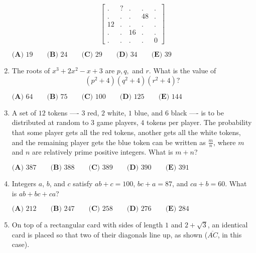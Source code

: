 \documentclass{article}
\begin{document}
\begin{enumerate}[label=\arabic*., itemsep=0.5em]
\begin{equation*}
\begin{bmatrix} . & ? &.&.&. \\ .&.&.&48&.\\ 12&.&.&.&.\\ .&.&16&.&.\\ .&.&.&.&0\end{bmatrix}
\end{equation*}

$\textbf{(A) } 19 \qquad \textbf{(B) } 24 \qquad \textbf{(C) } 29 \qquad \textbf{(D) } 34 \qquad \textbf{(E) } 39$\par \vspace{0.5em}\item The roots of $x^3 + 2x^2 - x + 3$ are $p, q,$ and $r.$ What is the value of 
\begin{equation*}
(p^2 + 4)(q^2 + 4)(r^2 + 4)?
\end{equation*}

$\textbf{(A) } 64 \qquad \textbf{(B) } 75 \qquad \textbf{(C) } 100 \qquad \textbf{(D) } 125 \qquad \textbf{(E) } 144$\par \vspace{0.5em}\item A set of $12$ tokens ---- $3$ red, $2$ white, $1$ blue, and $6$ black ---- is to be distributed at random to $3$ game players, $4$ tokens per player. The probability that some player gets all the red tokens, another gets all the white tokens, and the remaining player gets the blue token can be written as $\frac{m}{n}$, where $m$ and $n$ are relatively prime positive integers. What is $m+n$?

$
\textbf{(A) }387 \qquad
\textbf{(B) }388 \qquad
\textbf{(C) }389 \qquad
\textbf{(D) }390 \qquad
\textbf{(E) }391 \qquad
$\par \vspace{0.5em}\item Integers $a$, $b$, and $c$ satisfy $ab + c = 100$, $bc + a = 87$, and $ca + b = 60$. What is $ab + bc + ca$?

$
\textbf{(A) }212 \qquad
\textbf{(B) }247 \qquad
\textbf{(C) }258 \qquad
\textbf{(D) }276 \qquad
\textbf{(E) }284 \qquad
$\par \vspace{0.5em}\item On top of a rectangular card with sides of length $1$ and $2+\sqrt{3}$, an identical card is placed so that two of their diagonals line up, as shown ($\overline{AC}$, in this case).



\end{enumerate}
\end{document}
